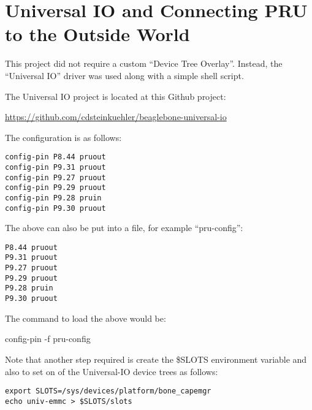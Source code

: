 %
%
%

\chapter{Universal IO and Connecting PRU to the Outside World}

This project did not require a custom ``Device Tree Overlay''.  Instead, the ``Universal IO'' driver was used along with a simple shell script.

The Universal IO project is located at this Github project:

\url{https://github.com/cdsteinkuehler/beaglebone-universal-io}

The configuration is as follows:

\begin{verbatim}
config-pin P8.44 pruout
config-pin P9.31 pruout
config-pin P9.27 pruout
config-pin P9.29 pruout
config-pin P9.28 pruin
config-pin P9.30 pruout
\end{verbatim}

The above can also be put into a file, for example ``pru-config'':

\begin{verbatim}
P8.44 pruout
P9.31 pruout
P9.27 pruout
P9.29 pruout
P9.28 pruin
P9.30 pruout
\end{verbatim}

The command to load the above would be:

config-pin -f pru-config

Note that another step required is create the \$SLOTS environment variable
and also to set on of the Universal-IO device trees as follows:

\begin{verbatim}
export SLOTS=/sys/devices/platform/bone_capemgr
echo univ-emmc > $SLOTS/slots 
\end{verbatim}


